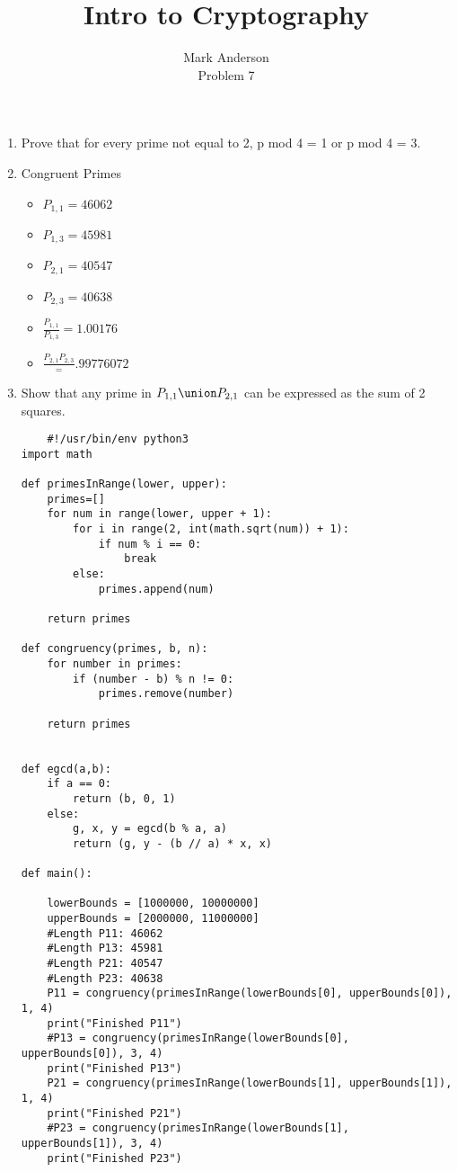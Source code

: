 \documentclass[12pt]{article}
\begin{document}
 
\title{Intro to Cryptography} 
\author{Mark Anderson\\ 
Problem 7} 
 
\maketitle
\begin{enumerate}
  \item Prove that for every prime not equal to 2, p mod 4 = 1 or p mod 4 = 3.
  \item Congruent Primes
    \begin{itemize}
      \item $P_{1,1} = 46062$
      \item $P_{1,3} = 45981$
      \item $P_{2,1} = 40547$
      \item $P_{2,3} = 40638$
      \item $\frac{P_{1,1}}{P_{1,3}} = 1.00176$
      \item $\frac{P_{2,1}{P_{2,3}}} = .99776072$

    \end{itemize}
  \item Show that any prime in $P_{1,1} \union P_{2,1} $ can be expressed as the sum of 2 squares.
    \begin{lstlisting}
    #!/usr/bin/env python3
import math

def primesInRange(lower, upper):
    primes=[]
    for num in range(lower, upper + 1):
        for i in range(2, int(math.sqrt(num)) + 1):
            if num % i == 0:
                break
        else:
            primes.append(num)

    return primes

def congruency(primes, b, n):
    for number in primes:
        if (number - b) % n != 0:
            primes.remove(number)

    return primes


def egcd(a,b):
    if a == 0:
        return (b, 0, 1)
    else:
        g, x, y = egcd(b % a, a)
        return (g, y - (b // a) * x, x)

def main():

    lowerBounds = [1000000, 10000000]
    upperBounds = [2000000, 11000000]
    #Length P11: 46062
    #Length P13: 45981
    #Length P21: 40547
    #Length P23: 40638
    P11 = congruency(primesInRange(lowerBounds[0], upperBounds[0]), 1, 4)
    print("Finished P11")
    #P13 = congruency(primesInRange(lowerBounds[0], upperBounds[0]), 3, 4)
    print("Finished P13")
    P21 = congruency(primesInRange(lowerBounds[1], upperBounds[1]), 1, 4)
    print("Finished P21")
    #P23 = congruency(primesInRange(lowerBounds[1], upperBounds[1]), 3, 4)
    print("Finished P23")


\end{lstlisting}
\end{enumerate}
\end{document}
